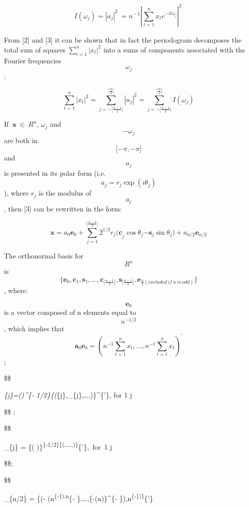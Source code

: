 \documentclass[
  letterpaper,
  DIV=11,
  numbers=noendperiod]{scrreprt}
\begin{document}
\[
{I\left( \omega_{j} \right)\mathbf{=}{\left| a_{j} \right|^{2}}_{\ } = n^{- \ 1}\left| \sum_{t = 1}^{n}x_{t}e^{- it\omega_{j}} \right|^{2}}_{\mathbf{\ }}
\]

From {[}2{]} and {[}3{]} it can be shown that in fact the periodogram
decomposes the total sum of squares
\(\sum_{t = 1}^{n}\left| x_{t} \right|^{2}\) into a sums of components
associated with the Fourier frequencies \[ω_{j}\]:

\[
  \sum_{t=1}^{n}{\left|x_{t}\right|}^{2} = \sum_{j = - \lbrack\frac{n - 1}{2}\rbrack}^{\lbrack\frac{n}{2}\rbrack}\left|a_{j}\right|^{2} = \sum_{j = - \lbrack\frac{n - 1}{2}\rbrack}^{\lbrack\frac{n}{2}\rbrack}{I\left( \omega_{j} \right)}
\]

If \(\ \mathbf{x\  \in}\ {R}^{n}\), \(\omega_{j}\) and \[{-\omega}_{j}\]
are both in \[\lbrack- \pi, -\pi \rbrack\] and \[a_{j}\] is presented in
its polar form (i.e.\[a_{j} = r_{j}\exp\left( i\theta_{j} \right)\]),
where \(r_{j}\) is the modulus of \[a_{j}\], then {[}3{]} can be
rewritten in the form:

\[
 \mathbf{x} = a_{0}\mathbf{e}_{0} + \sum_{j = 1}^{\lbrack\frac{n - 1}{2}\rbrack}{ {2^{1/2}r}_{j}{(\mathbf{c}}_{j}\cos\theta_{j}{- \mathbf{s}}_{j}\sin\theta_{j}) + a_{n/2}\mathbf{e}_{n/2}}
 \]

The orthonormal basis for \[{R}^{n}\] is
\[\{\mathbf{e}_{0},\mathbf{c}_{1},\mathbf{s}_{1},\ldots,\mathbf{c}_{\lbrack\frac{n - 1}{2}\rbrack},\mathbf{s}_{\lbrack\frac{n - 1}{2}\rbrack},\mathbf{e}_{\frac{n}{2}(excluded\ if\ n\ is\ odd)}\}
\], where:

\[\mathbf{e}_{0}\] is a vector composed of n elements equal to
\[n^{- 1/2}\], which implies that
\[\mathbf{a}_{0}\mathbf{e}_{0} = {(n^{-1}\sum_{t = 1}^{n}x_{t},\ldots,n^{- 1}\sum_{t=1}^{n}x_{t})}^{'}\];

\$\$

\emph{\{j\}=\left(\right)\^{}\{-
1/2\}\{\left(\cos\omega}\{j\},\cos{2\omega}\_\{j\},\ldots,\right)\}\^{}\{'\},
for 1 \leq j \leq \lbrack {}\rbrack

\$\$ ;

\$\$

\_\{j\} = \{\left( 
\right)\}\textsuperscript{\{-1/2\}\{\left(,,\ldots,\right)\}}\{'\},~for~1
\leq j \leq \lbrack {} \rbrack

\$\$;

\$\$

\_\{n/2\} = \{\left(-
\left(n\textsuperscript{\{-\}\right),n}\{-
\},\ldots,\{-\left(n\right)\}\^{}\{-
\}),n\textsuperscript{\{-\}\right)\}}\{'\}
\end{document}
